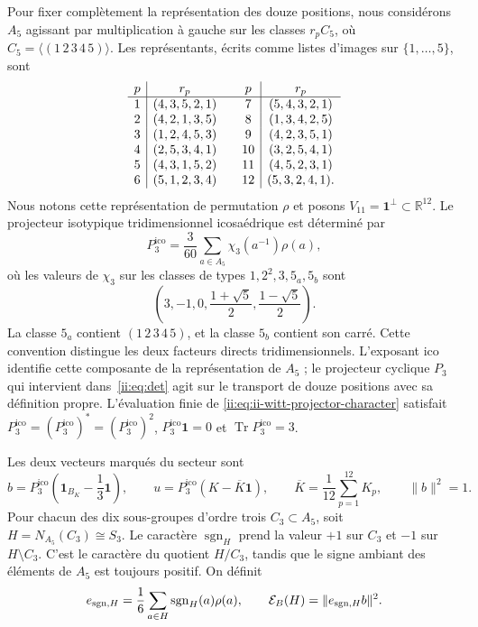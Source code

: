 Pour fixer complètement la représentation des douze positions,
nous considérons \(A_5\) agissant par multiplication à gauche sur les
classes \(r_pC_5\), où \(C_5=\langle(1\,2\,3\,4\,5)\rangle\).
Les représentants, écrits comme listes d’images sur
\(\{1,\ldots,5\}\), sont
\[
\begin{array}{c|c@{\qquad}c|c}
p&r_p&p&r_p\\ \hline
1&(4,3,5,2,1)&7&(5,4,3,2,1)\\
2&(4,2,1,3,5)&8&(1,3,4,2,5)\\
3&(1,2,4,5,3)&9&(4,2,3,5,1)\\
4&(2,5,3,4,1)&10&(3,2,5,4,1)\\
5&(4,3,1,5,2)&11&(4,5,2,3,1)\\
6&(5,1,2,3,4)&12&(5,3,2,4,1).
\end{array}
\]
Nous notons cette représentation de permutation \(\rho\) et posons
\(V_{11}=\mathbf1^\perp\subset\mathbb R^{12}\). Le projecteur
isotypique tridimensionnel icosaédrique est déterminé par
\begin{equation}
 P_3^{\mathrm{ico}}=\frac3{60}\sum_{a\in A_5}\chi_3(a^{-1})\rho(a),
 \label{ii:eq:ii-witt-projector-character}
\end{equation}
où les valeurs de \(\chi_3\) sur les classes de types
\(1,2^2,3,5_a,5_b\) sont
\[
 \left(3,-1,0,\frac{1+\sqrt5}{2},\frac{1-\sqrt5}{2}\right).
\]
La classe \(5_a\) contient \((1\,2\,3\,4\,5)\), et la classe
\(5_b\) contient son carré. Cette convention distingue les deux
facteurs directs tridimensionnels. L’exposant \(\mathrm{ico}\) identifie
cette composante de la représentation de \(A_5\) ; le projecteur cyclique
\(P_3\) qui intervient dans~\eqref{ii:eq:det} agit sur le transport de douze
positions avec sa définition propre. L’évaluation finie de
\eqref{ii:eq:ii-witt-projector-character} satisfait
\(P_3^{\mathrm{ico}}=(P_3^{\mathrm{ico}})^*=(P_3^{\mathrm{ico}})^2\), \(P_3^{\mathrm{ico}}\mathbf1=0\) et
\(\operatorname{Tr}P_3^{\mathrm{ico}}=3\).

Les deux vecteurs marqués du secteur sont
\[
 b=P_3^{\mathrm{ico}}\left(\mathbf1_{B_K}-\frac13\mathbf1\right),
 \qquad u=P_3^{\mathrm{ico}}(K-\overline K\mathbf1),
 \qquad \overline K=\frac1{12}\sum_{p=1}^{12}K_p,
 \qquad \|b\|^2=1.
\]
Pour chacun des dix sous-groupes d’ordre trois \(C_3\subset A_5\),
soit \(H=N_{A_5}(C_3)\cong S_3\). Le caractère
\(\operatorname{sgn}_H\) prend la valeur \(+1\) sur \(C_3\) et
\(-1\) sur \(H\setminus C_3\). C’est le caractère du quotient
\(H/C_3\), tandis que le signe ambiant des éléments de \(A_5\)
est toujours positif. On définit
\begin{equation}
 e_{{\rm sgn},H}=\frac16\sum_{a\in H}\operatorname{sgn}_H(a)\rho(a),
 \qquad \mathcal E_B(H)=\|e_{{\rm sgn},H}b\|^2.
 \label{ii:eq:ii-witt-energy}
\end{equation}

